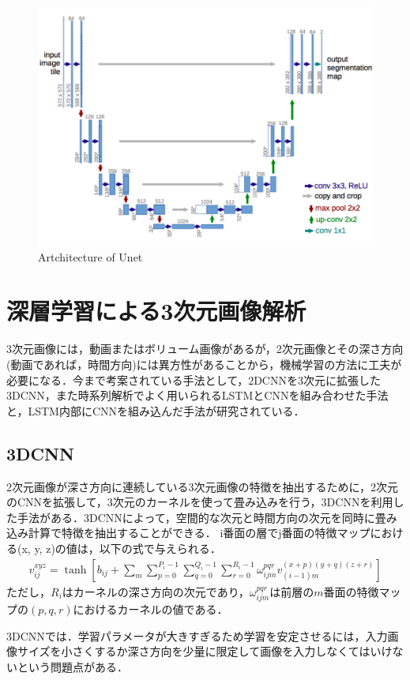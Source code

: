 \begin{figure}[H]
	\centering
	\includegraphics[width=0.7\linewidth]{fig/unet.png}
	\caption{Artchitecture of Unet\cite{Unet}}
	\label{fig:Unet}
\end{figure}


\section{深層学習による3次元画像解析}\label{sec:3Danalysis}
3次元画像には，動画またはボリューム画像があるが，2次元画像とその深さ方向(動画であれば，時間方向)には異方性があることから，機械学習の方法に工夫が必要になる．今まで考案されている手法として，2DCNNを3次元に拡張した3DCNN，また時系列解析でよく用いられるLSTMとCNNを組み合わせた手法と，LSTM内部にCNNを組み込んだ手法が研究されている．


\subsection{3DCNN}
2次元画像が深さ方向に連続している3次元画像の特徴を抽出するために，2次元のCNNを拡張して，3次元のカーネルを使って畳み込みを行う，3DCNN\cite{Hosseini-AslGE16, BroschTYLTT16, ji20133d}を利用した手法がある．3DCNNによって，空間的な次元と時間方向の次元を同時に畳み込み計算で特徴を抽出することができる．
i番面の層でj番面の特徴マップにおける(x, y, z)の値は，以下の式で与えられる．
\begin{align}\label{eq:3dcnn}
v_{ij}^{xyz} = \tanh \left[ b_{ij} + \sum_{m} \sum_{p=0}^{P_i -1} \sum_{q=0}^{Q_i -1} \sum_{r=0}^{R_i -1} \omega_{ijm}^{pqr} v_{(i-1)m}^{(x+p)(y+q)(z+r)}\right]
\end{align}
ただし，$R_i$はカーネルの深さ方向の次元であり，$\omega_{ijm}^{pqr}$は前層の$m$番面の特徴マップの$(p, q, r)$におけるカーネルの値である．

3DCNNでは．学習パラメータが大きすぎるため学習を安定させるには，入力画像サイズを小さくするか深さ方向を少量に限定して画像を入力しなくてはいけないという問題点がある．

